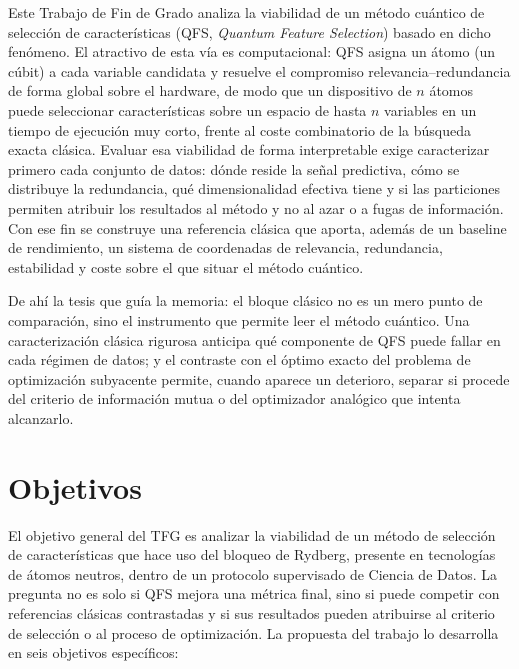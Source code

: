Este Trabajo de Fin de Grado analiza la viabilidad de un método
cuántico de selección de características (QFS, \textit{Quantum Feature
Selection}) basado en dicho fenómeno. El atractivo de esta vía es
computacional: QFS asigna un átomo (un cúbit) a cada variable
candidata y resuelve el compromiso relevancia--redundancia de forma
global sobre el hardware, de modo que un dispositivo de $n$ átomos puede
seleccionar características sobre un espacio de hasta $n$ variables en un
tiempo de ejecución muy corto, frente al coste combinatorio de la
búsqueda exacta clásica. Evaluar esa viabilidad de forma interpretable
exige caracterizar primero cada conjunto de datos: dónde reside la señal
predictiva, cómo se distribuye la redundancia, qué dimensionalidad
efectiva tiene y si las particiones permiten atribuir los resultados al
método y no al azar o a fugas de información. Con ese fin se construye
una referencia clásica que aporta, además de un baseline de rendimiento,
un sistema de coordenadas de relevancia, redundancia, estabilidad y coste
sobre el que situar el método cuántico.

De ahí la tesis que guía la memoria: el bloque clásico no es un mero
punto de comparación, sino el instrumento que permite leer el método
cuántico. Una caracterización clásica rigurosa anticipa qué componente
de QFS puede fallar en cada régimen de datos; y el contraste con el
óptimo exacto del problema de optimización subyacente permite, cuando
aparece un deterioro, separar si procede del criterio de información
mutua o del optimizador analógico que intenta alcanzarlo.

\section{Objetivos}

El objetivo general del TFG es analizar la viabilidad de un método de
selección de características que hace uso del bloqueo de Rydberg,
presente en tecnologías de átomos neutros, dentro de un protocolo
supervisado de Ciencia de Datos. La pregunta no es solo si QFS mejora
una métrica final, sino si puede competir con referencias clásicas
contrastadas y si sus resultados pueden atribuirse al criterio de
selección o al proceso de optimización. La propuesta del trabajo lo
desarrolla en seis objetivos específicos:

